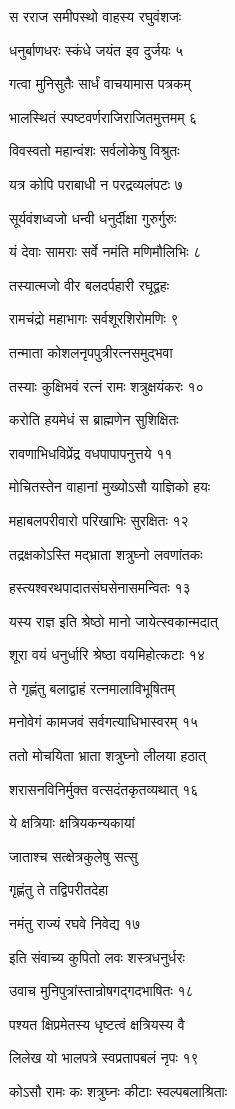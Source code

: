 स रराज समीपस्थो वाहस्य रघुवंशजः

धनुर्बाणधरः स्कंधे जयंत इव दुर्जयः ५

गत्वा मुनिसुतैः सार्धं वाचयामास पत्रकम्

भालस्थितं स्पष्टवर्णराजिराजितमुत्तमम् ६

विवस्वतो महान्वंशः सर्वलोकेषु विश्रुतः

यत्र कोपि पराबाधी न परद्रव्यलंपटः ७

सूर्यवंशध्वजो धन्वी धनुर्दीक्षा गुरुर्गुरुः

यं देवाः सामराः सर्वे नमंति मणिमौलिभिः ८

तस्यात्मजो वीर बलदर्पहारी रघूद्वहः

रामचंद्रो महाभागः सर्वशूरशिरोमणिः ९

तन्माता कोशलनृपपुत्रीरत्नसमुद्भवा

तस्याः कुक्षिभवं रत्नं रामः शत्रुक्षयंकरः १०

करोति हयमेधं स ब्राह्मणेन सुशिक्षितः

रावणाभिधविप्रेंद्र वधपापापनुत्तये ११

मोचितस्तेन वाहानां मुख्योऽसौ याज्ञिको हयः

महाबलपरीवारो परिखाभिः सुरक्षितः १२

तद्रक्षकोऽस्ति मद्भ्राता शत्रुघ्नो लवणांतकः

हस्त्यश्वरथपादातसंघसेनासमन्वितः १३

यस्य राज्ञ इति श्रेष्ठो मानो जायेत्स्वकान्मदात्

शूरा वयं धनुर्धारि श्रेष्ठा वयमिहोत्कटाः १४

ते गृह्णंतु बलाद्वाहं रत्नमालाविभूषितम्

मनोवेगं कामजवं सर्वगत्याधिभास्वरम् १५

ततो मोचयिता भ्राता शत्रुघ्नो लीलया हठात्

शरासनविनिर्मुक्त वत्सदंतकृतव्यथात् १६

ये क्षत्रियाः क्षत्रियकन्यकायां

जाताश्च सत्क्षेत्रकुलेषु सत्सु

गृह्णंतु ते तद्विपरीतदेहा

नमंतु राज्यं रघवे निवेद्य १७

इति संवाच्य कुपितो लवः शस्त्रधनुर्धरः

उवाच मुनिपुत्रांस्तान्रोषगद्गदभाषितः १८

पश्यत क्षिप्रमेतस्य धृष्टत्वं क्षत्रियस्य वै

लिलेख यो भालपत्रे स्वप्रतापबलं नृपः १९

कोऽसौ रामः कः शत्रुघ्नः कीटाः स्वल्पबलाश्रिताः

